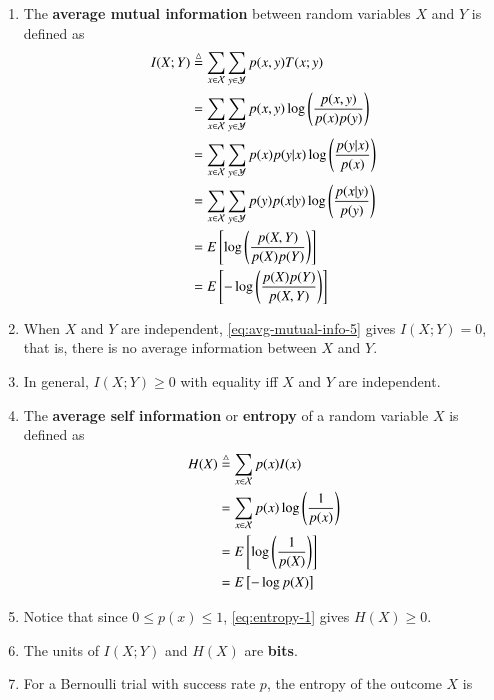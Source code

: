 \documentclass[journal,12pt,twocolumn]{IEEEtran}
\renewcommand\thesection{\arabic{section}}
\begin{document}
\begin{enumerate}[label=\thesection.\arabic*, ref=\thesection.\theenumi]
    \item The \textbf{average mutual information} between random variables $X$ 
    and $Y$ is defined as
    \begin{align}
        I(X;Y) &\stackrel{\triangle}{=} \sum_{x\in\mathcal{X}}\sum_{y\in\mathcal{Y}}p(x,y)T(x;y) \label{eq:avg-mutual-info-1} \\
        &= \sum_{x\in\mathcal{X}}\sum_{y\in\mathcal{Y}}p(x,y)\log\left(\frac{p(x,y)}{p(x)p(y)}\right) \label{eq:avg-mutual-info-2} \\
        &= \sum_{x\in\mathcal{X}}\sum_{y\in\mathcal{Y}}p(x)p(y|x)\log\left(\frac{p(y|x)}{p(x)}\right) \label{eq:avg-mutual-info-3} \\
        &= \sum_{x\in\mathcal{X}}\sum_{y\in\mathcal{Y}}p(y)p(x|y)\log\left(\frac{p(x|y)}{p(y)}\right) \label{eq:avg-mutual-info-4} \\
        &= E{}\left[\log\left(\frac{p(X,Y)}{p(X)p(Y)}\right)\right] \label{eq:avg-mutual-info-5} \\
        &= E{}\left[-\log\left(\frac{p(X)p(Y)}{p(X,Y)}\right)\right] \label{eq:avg-mutual-info-6}
    \end{align}
    \item When $X$ and $Y$ are independent, \eqref{eq:avg-mutual-info-5} gives 
    $I(X;Y) = 0$, that is, there is no average information between $X$ and $Y$.
    \item In general, $I(X;Y) \ge 0$ with equality iff $X$ and $Y$ are independent.
    \item The \textbf{average self information} or \textbf{entropy} of a random 
    variable $X$ is defined as
    \begin{align}
        H(X) &\stackrel{\triangle}{=} \sum_{x\in\mathcal{X}}p(x)I(x) \label{eq:entropy-1} \\
        &= \sum_{x\in\mathcal{X}}p(x)\log\left(\frac{1}{p(x)}\right) \label{eq:entropy-2} \\
        &= E{}\left[\log\left(\frac{1}{p(X)}\right)\right] \label{eq:entropy-3} \\
        &= E{}\left[-\log p(X)\right] \label{eq:entropy-4}
    \end{align}
    \item Notice that since $0 \le p(x) \le 1$, \eqref{eq:entropy-1} gives 
    $H(X) \ge 0$.
    \item The units of $I(X;Y)$ and $H(X)$ are \textbf{bits}.
    \item For a Bernoulli trial with success rate $p$, the entropy of the
    outcome $X$ is

\end{enumerate}
\end{document}
